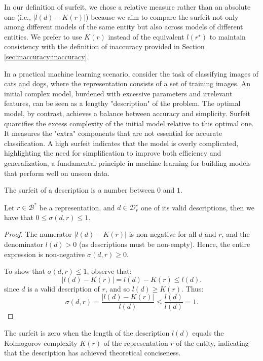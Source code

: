 In our definition of surfeit, we chose a relative measure rather than an absolute one (i.e., $| l(d) - K(r) |$) because we aim to compare the surfeit not only among different models of the same entity but also across models of different entities. We prefer to use $K(r)$ instead of the equivalent $l \left( r^\star \right)$ to maintain consistency with the definition of inaccuracy provided in Section \ref{sec:inaccuracy:inaccuracy}.

\begin{example}
In a practical machine learning scenario, consider the task of classifying images of cats and dogs, where the representation consists of a set of training images. An initial complex model, burdened with excessive parameters and irrelevant features, can be seen as a lengthy "description" of the problem. The optimal model, by contrast, achieves a balance between accuracy and simplicity. Surfeit quantifies the excess complexity of the initial model relative to this optimal one. It measures the "extra" components that are not essential for accurate classification. A high surfeit indicates that the model is overly complicated, highlighting the need for simplification to improve both efficiency and generalization, a fundamental principle in machine learning for building models that perform well on unseen data.
\end{example}

The surfeit of a description is a number between $0$ and $1$.

\begin{proposition}
\label{prop:range_surfeit}
Let $r \in \mathcal{B}^\ast$ be a representation, and $d \in \mathcal{D}^\star_r$ one of its valid descriptions, then we have that $0 \leq \sigma(d, r) \leq 1$.
\end{proposition}
\begin{proof}
The numerator $|l(d) - K(r)|$ is non-negative for all $d$ and $r$, and the denominator $l(d) > 0$ (as descriptions must be non-empty). Hence, the entire expression is non-negative $\sigma(d, r) \geq 0$.

To show that $\sigma(d, r) \leq 1$, observe that:
\[
|l(d) - K(r)| = l(d) - K(r) \leq l(d).
\]
since $d$ is a valid description of $r$, and so $l(d) \geq K(r)$. Thus:
\[
\sigma(d, r) = \frac{|l(d) - K(r)|}{l(d)} \leq \frac{l(d)}{l(d)} = 1.
\]
\end{proof}

The surfeit is zero when the length of the description $l(d)$ equals the Kolmogorov complexity $K(r)$ of the representation $r$ of the entity, indicating that the description has achieved theoretical conciseness.


